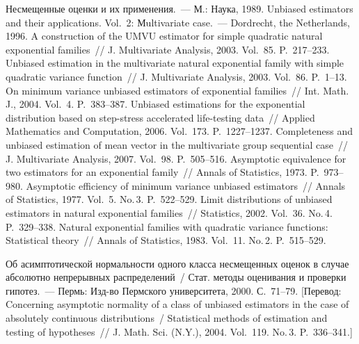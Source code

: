 \begin{multicols}{2}
{\small\frenchspacing
{%
\begin{thebibliography}{99}    

Несмещенные оценки и их применения.~---
 М.: Наука, 1989.
Unbiased estimators and their
applications. Vol.~2: Мultivariate case.~---  Dordrecht, the Netherlands, 1996.
A construction of the UMVU estimator for simple
quadratic natural exponential families~// J. Multivariate Analysis, 2003.
Vol.~85. P.~217--233.
Unbiased estimation in the
 multivariate natural exponential family with simple quadratic variance function~//
 J. Multivariate Analysis, 2003. Vol.~86. P.~1--13.
On minimum variance unbiased estimators of
exponential families~// Int. Math. J., 2004. Vol.~4. P.~383--387.
Unbiased estimations for the exponential distribution
 based on step-stress accelerated life-testing data~// Applied Mathematics
 and Computation, 2006. Vol.~173. P.~1227--1237.
Completeness and unbiased
estimation of mean vector in the multivariate group sequential
case~// J. Multivariate Analysis, 2007. Vol.~98. P.~505--516.
Asymptotic equivalence for two estimators
for an exponential family~// Annals of Statistics, 1973. P.~973--980.
Asymptotic efficiency of minimum
variance unbiased estimators~// Annals of Statistics, 1977. Vol.~5.
No.\,3. P.~522--529.
Limit distributions of unbiased estimators
in natural exponential families~// Statistics, 2002. Vol.~36. No.\,4. P.~329--338.
Natural exponential families with
quadratic variance functions: Statistical theory~//  Annals of
Statistics, 1983. Vol.~11. No.\,2. P.~515--529.

Об асимптотической нормальности одного
класса несмещенных оценок в случае абсолютно непрерывных
распределений~/ Стат. методы оценивания и проверки гипотез.~---
 Пермь: Изд-во Пермского университета, 2000. С.~71--79. [Перевод:
 Concerning asymptotic normality of a
class of unbiased estimators in the case of absolutely continuous
distributions~/ Statistical methods of estimation and testing of
hypotheses~// J. Math. Sci. (N.Y.), 2004. Vol.~119. No.\,3. P.~336--341.]


\end{thebibliography}}}
\end{multicols}
